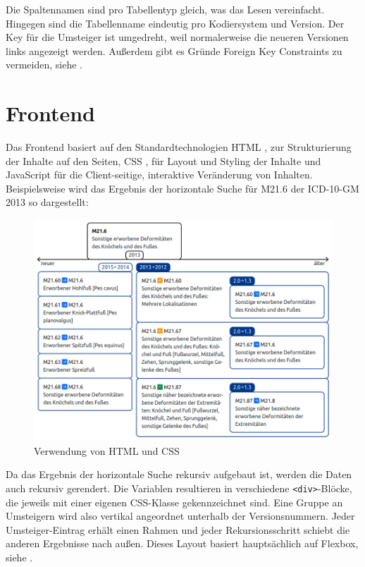 Die Spaltennamen sind pro Tabellentyp gleich, was das Lesen vereinfacht. Hingegen sind die Tabellenname eindeutig pro Kodiersystem und Version. Der Key für die Umsteiger ist umgedreht, weil normalerweise die neueren Versionen links angezeigt werden. Außerdem gibt es Gründe Foreign Key Constraints zu vermeiden, siehe \cite{fkey-constraints}.

\section{Frontend}

Das Frontend basiert auf den Standardtechnologien HTML \cite{html}, zur Strukturierung der Inhalte auf den Seiten, CSS \cite{css}, für Layout und Styling der Inhalte und JavaScript \cite{javascript} für die Client-seitige, interaktive Veränderung von Inhalten. Beispielsweise wird das Ergebnis der horizontale Suche für M21.6 der ICD-10-GM 2013 so dargestellt:

\begin{figure}[H]
    \centering
    \includegraphics[width=\linewidth]{../img/umsteiger.png}
    \caption{Verwendung von HTML und CSS}
\end{figure}

Da das Ergebnis der horizontale Suche rekursiv aufgebaut ist, werden die Daten auch rekursiv gerendert. Die Variablen resultieren in verschiedene \texttt{<div>}-Blöcke, die jeweils mit einer eigenen CSS-Klasse gekennzeichnet sind. Eine Gruppe an Umsteigern wird also vertikal angeordnet unterhalb der Versionsnummern. Jeder Umsteiger-Eintrag erhält einen Rahmen und jeder Rekursionsschritt schiebt die anderen Ergebnisse nach außen. Dieses Layout basiert hauptsächlich auf Flexbox, siehe \cite{flexbox-csstricks}. 

